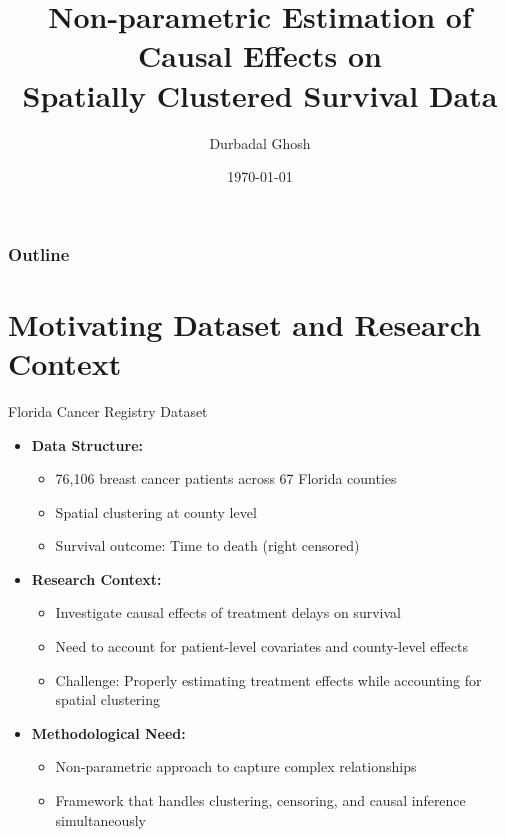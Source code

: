 \documentclass{beamer}
\title{Non-parametric Estimation of Causal Effects on \\ Spatially Clustered Survival Data}
\author{Durbadal Ghosh}
\date{\today}
\begin{document}
\begin{frame}
  \titlepage
\end{frame}

\begin{frame}
  \frametitle{Outline}
  \tableofcontents
\end{frame}


\section{Motivating Dataset and Research Context}

\begin{frame}{Florida Cancer Registry Dataset}
\begin{itemize}
    \item \textbf{Data Structure:} 
    \begin{itemize}
        \item 76,106 breast cancer patients across 67 Florida counties
        \item Spatial clustering at county level
        \item Survival outcome: Time to death (right censored)
    \end{itemize}
    \item \textbf{Research Context:}
    \begin{itemize}
        \item Investigate causal effects of treatment delays on survival
        \item Need to account for patient-level covariates and county-level effects
        \item Challenge: Properly estimating treatment effects while accounting for spatial clustering
    \end{itemize}
    \item \textbf{Methodological Need:}
    \begin{itemize}
        \item Non-parametric approach to capture complex relationships
        \item Framework that handles clustering, censoring, and causal inference simultaneously
    \end{itemize}
\end{itemize}
\end{frame}
\end{document}

